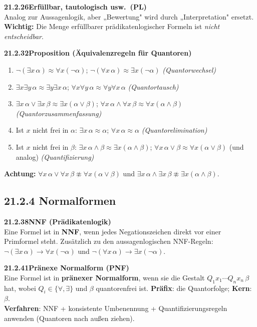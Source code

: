 \documentclass[a4paper,12pt]{article}
\newcommand{\gentry}[3]{%
  \noindent\textbf{#1\quad #2}\nopagebreak\\[0.2em]
  #3\par\smallskip
}
\begin{document}
\gentry{21.2.26}{Erfüllbar, tautologisch usw.\ (PL)}{%
  Analog zur Aussagenlogik, aber „Bewertung" wird durch „Interpretation" ersetzt.
  \textbf{Wichtig:} Die Menge erfüllbarer prädikatenlogischer Formeln ist
  \emph{nicht entscheidbar}.
}

\gentry{21.2.32}{Proposition (Äquivalenzregeln für Quantoren)}{%
  \begin{enumerate}[label=\arabic*.,topsep=2pt,itemsep=1pt]
    \item $\lnot(\exists x\,\alpha) \approx \forall x(\lnot\alpha)$;\quad
          $\lnot(\forall x\,\alpha) \approx \exists x(\lnot\alpha)$ \hfill\emph{(Quantorwechsel)}
    \item $\exists x\exists y\,\alpha \approx \exists y\exists x\,\alpha$;\quad
          $\forall x\forall y\,\alpha \approx \forall y\forall x\,\alpha$ \hfill\emph{(Quantortausch)}
    \item $\exists x\,\alpha \lor \exists x\,\beta \approx \exists x(\alpha \lor \beta)$;\quad
          $\forall x\,\alpha \land \forall x\,\beta \approx \forall x(\alpha \land \beta)$
          \hfill\emph{(Quantorzusammenfassung)}
    \item Ist $x$ nicht frei in $\alpha$: $\exists x\,\alpha \approx \alpha$;\quad
          $\forall x\,\alpha \approx \alpha$ \hfill\emph{(Quantorelimination)}
    \item Ist $x$ nicht frei in $\beta$:
          $\exists x\,\alpha \land \beta \approx \exists x(\alpha \land \beta)$;\quad
          $\forall x\,\alpha \lor \beta \approx \forall x(\alpha \lor \beta)$
          (und analog) \hfill\emph{(Quantifizierung)}
  \end{enumerate}
  \textbf{Achtung:} $\forall x\,\alpha \lor \forall x\,\beta \not\approx \forall x(\alpha \lor \beta)$
  und $\exists x\,\alpha \land \exists x\,\beta \not\approx \exists x(\alpha \land \beta)$.
}

\subsection*{21.2.4 Normalformen}

\gentry{21.2.38}{NNF (Prädikatenlogik)}{%
  Eine Formel ist in \textbf{NNF}, wenn jedes Negationszeichen direkt vor einer
  Primformel steht. Zusätzlich zu den aussagenlogischen NNF-Regeln:
  $\lnot(\exists x\,\alpha) \to \forall x(\lnot\alpha)$ und
  $\lnot(\forall x\,\alpha) \to \exists x(\lnot\alpha)$.
}

\gentry{21.2.41}{Pränexe Normalform (PNF)}{%
  Eine Formel ist in \textbf{pränexer Normalform}, wenn sie die Gestalt
  $Q_1 x_1 \cdots Q_n x_n\, \beta$ hat, wobei $Q_i \in \{\forall,\exists\}$ und
  $\beta$ quantorenfrei ist.
  \textbf{Präfix}: die Quantorfolge; \textbf{Kern}: $\beta$.\\
  \textbf{Verfahren}: NNF + konsistente Umbenennung + Quantifizierungsregeln anwenden
  (Quantoren nach außen ziehen).
}
\end{document}

